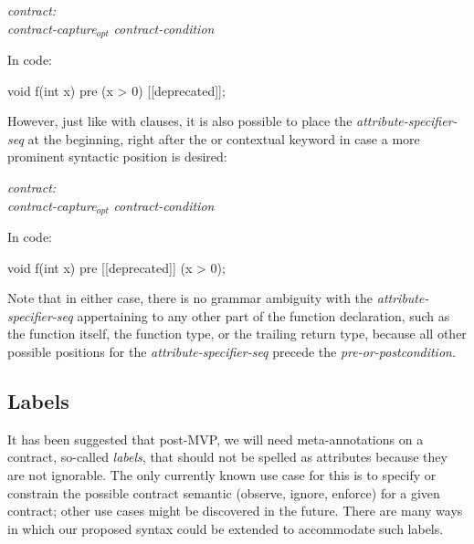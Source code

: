 \begin{adjustwidth}{0.5cm}{0.5cm}

\emph{contract:} \\
\phantom{~~~}\emph{contract-capture}$_{opt}$ \emph{contract-condition} 

\end{adjustwidth}

In code:

\begin{codeblock}
void f(int x)
  pre (x > 0) [[deprecated]];
\end{codeblock}

However, just like with  clauses, it is also possible to place the \emph{attribute-specifier-seq} at the beginning, right after the  or  contextual keyword in case a more prominent syntactic position is desired:

\begin{adjustwidth}{0.5cm}{0.5cm}

\emph{contract:} \\
\phantom{~~~} \emph{contract-capture}$_{opt}$ \emph{contract-condition} 

\end{adjustwidth}

In code:

\begin{codeblock}
void f(int x)
  pre [[deprecated]] (x > 0);
\end{codeblock}

Note that in either case, there is no grammar ambiguity with the \emph{attribute-specifier-seq} appertaining to any other part of the function declaration, such as the function itself, the function type, or the trailing return type, because all other possible positions for the \emph{attribute-specifier-seq} precede the \emph{pre-or-postcondition}.


\subsection{Labels}
\label{subsec:labels}

It has been suggested that post-MVP, we will need meta-annotations on a contract, so-called \emph{labels}, that should not be spelled as attributes because they are not ignorable. The only currently known use case for this is to specify or constrain the possible contract semantic (observe, ignore, enforce) for a given contract; other use cases might be discovered in the future. There are many ways in which our proposed syntax could be extended to accommodate such labels.

